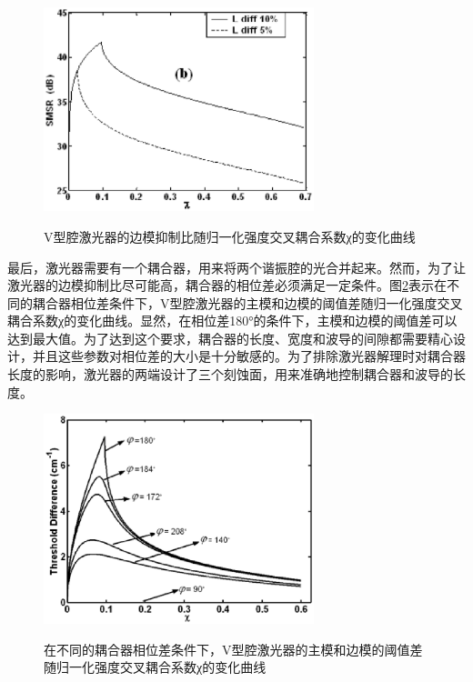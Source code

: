 \documentclass{ZJUthesis}
\begin{document}
\begin{figure}[!ht]
  \centering
  \includegraphics[width=0.7\textwidth]{./Pictures/vccl_smsr.eps}\\
  \caption{V型腔激光器的边模抑制比随归一化强度交叉耦合系数χ的变化曲线}
  \label{fig_vccl_smsr}
\end{figure}

最后，激光器需要有一个耦合器，用来将两个谐振腔的光合并起来。然而，为了让激光器的边模抑制比尽可能高，耦合器的相位差必须满足一定条件。图\ref{fig_vccl_thd}表示在不同的耦合器相位差条件下，V型腔激光器的主模和边模的阈值差随归一化强度交叉耦合系数χ的变化曲线。显然，在相位差180°的条件下，主模和边模的阈值差可以达到最大值。为了达到这个要求，耦合器的长度、宽度和波导的间隙都需要精心设计，并且这些参数对相位差的大小是十分敏感的。为了排除激光器解理时对耦合器长度的影响，激光器的两端设计了三个刻蚀面，用来准确地控制耦合器和波导的长度。

\begin{figure}[!ht]
  \centering
  \includegraphics[width=0.7\textwidth]{./Pictures/vccl_thd.eps}\\
  \caption{在不同的耦合器相位差条件下，V型腔激光器的主模和边模的阈值差随归一化强度交叉耦合系数χ的变化曲线}
  \label{fig_vccl_thd}
\end{figure}
\end{document}
